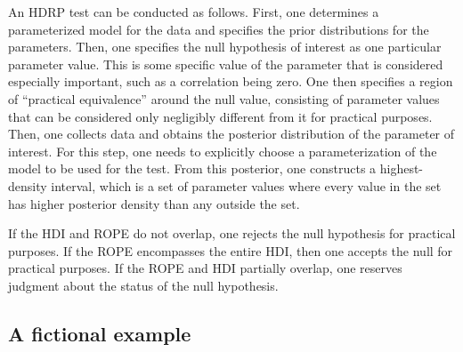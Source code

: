 \documentclass[man]{apa}
\newcommand{\hdr}{HDRP}
\begin{document}
An \hdr{} test can be conducted as follows.  
First, one determines a parameterized model for the data and specifies the prior distributions for the parameters. 
Then, one specifies the null hypothesis of interest as one particular parameter value. This is some specific value of the parameter that is considered especially important, such as a correlation being zero.
One then specifies a region of ``practical equivalence'' around the null value, consisting of parameter values that can be considered only negligibly different from it for practical purposes.
Then, one collects data and obtains the posterior distribution of the parameter of interest. For this step, one needs to explicitly choose a parameterization of the model to be used for the test. 
From this posterior, one constructs a highest-density interval, which is a set of parameter values where every value in the set has higher posterior density than any outside the set. 

If the HDI and ROPE do not overlap, one rejects the null hypothesis for practical purposes. If the ROPE encompasses the entire HDI, then one accepts the null for practical purposes. If the ROPE and HDI partially overlap, one reserves judgment about the status of the null hypothesis. 










    
\subsection*{A fictional example}
    
\end{document}
